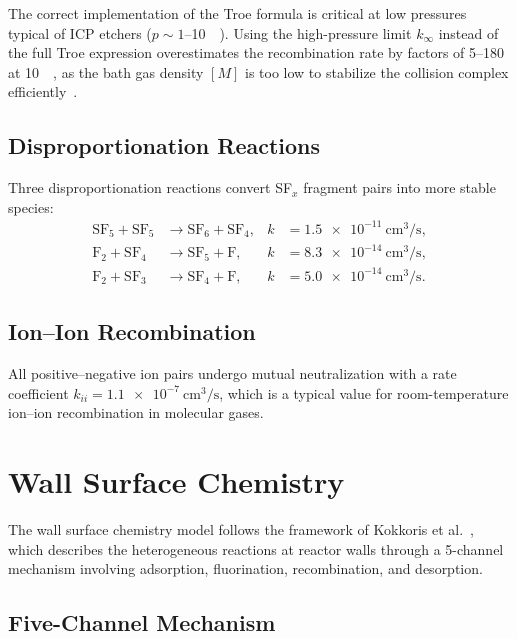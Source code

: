 \documentclass[11pt,a4paper]{report}
\begin{document}
The correct implementation of the Troe formula is critical at low pressures typical of ICP etchers ($p \sim 1$--\SI{10}{\milli\torr}).  Using the high-pressure limit $k_\infty$ instead of the full Troe expression overestimates the recombination rate by factors of 5--180 at \SI{10}{\milli\torr}, as the bath gas density $[M]$ is too low to stabilize the collision complex efficiently~\cite{Ryan1990}.

\subsection{Disproportionation Reactions}

Three disproportionation reactions convert SF$_x$ fragment pairs into more stable species:
\begin{align}
  \text{SF}_5 + \text{SF}_5 &\to \text{SF}_6 + \text{SF}_4, & k &= \SI{1.5e-11}{\centi\meter\cubed\per\second}, \\
  \text{F}_2 + \text{SF}_4 &\to \text{SF}_5 + \text{F},     & k &= \SI{8.3e-14}{\centi\meter\cubed\per\second}, \\
  \text{F}_2 + \text{SF}_3 &\to \text{SF}_4 + \text{F},     & k &= \SI{5.0e-14}{\centi\meter\cubed\per\second}.
\end{align}

\subsection{Ion--Ion Recombination}

All positive--negative ion pairs undergo mutual neutralization with a rate coefficient $k_{ii} = \SI{1.1e-7}{\centi\meter\cubed\per\second}$, which is a typical value for room-temperature ion--ion recombination in molecular gases.


\section{Wall Surface Chemistry}
\label{sec:wall-chemistry}

The wall surface chemistry model follows the framework of Kokkoris et al.~\cite{Kokkoris2009}, which describes the heterogeneous reactions at reactor walls through a 5-channel mechanism involving adsorption, fluorination, recombination, and desorption.

\subsection{Five-Channel Mechanism}
\end{document}
